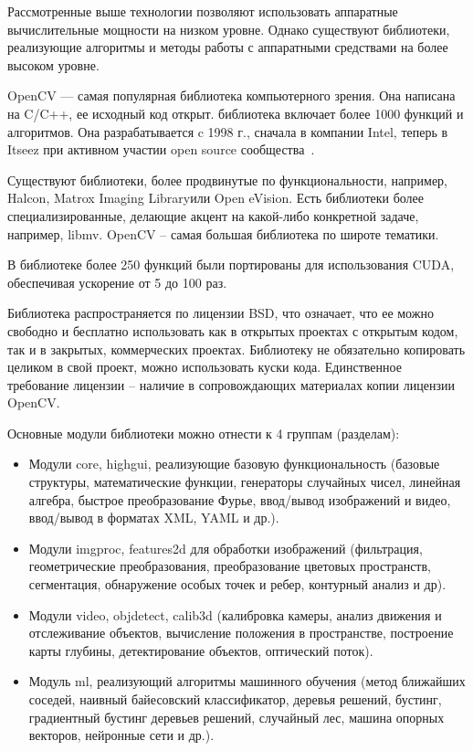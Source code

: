Рассмотренные выше технологии позволяют использовать аппаратные вычислительные мощности на низком уровне. Однако существуют библиотеки, реализующие алгоритмы и методы работы с аппаратными средствами на более высоком уровне. 

OpenCV --- самая популярная библиотека компьютерного зрения. Она написана на C/C++, ее исходный код открыт. библиотека включает более 1000 функций и алгоритмов. Она разрабатывается c 1998 г., сначала в компании Intel, теперь в Itseez при активном участии open source сообщества~\cite{ocvrus_wiki}.

Существуют библиотеки, более продвинутые по функциональности, например, Halcon, Matrox Imaging Libraryили  Open eVision. Есть библиотеки более специализированные, делающие акцент на какой-либо конкретной задаче, например, libmv. OpenCV – самая большая библиотека по широте тематики.

В библиотеке более 250 функций были портированы для использования CUDA, обеспечивая ускорение от 5 до 100 раз.

Библиотека распространяется по лицензии BSD, что означает, что ее можно свободно и бесплатно использовать как в открытых проектах с открытым кодом, так и в закрытых, коммерческих проектах. Библиотеку не обязательно копировать целиком в свой проект, можно использовать куски кода. Единственное требование лицензии – наличие в сопровождающих материалах копии лицензии OpenCV.

Основные модули библиотеки можно отнести к 4 группам (разделам):
\begin{itemize}
  \item Модули core, highgui, реализующие базовую функциональность (базовые структуры, математические функции, генераторы случайных чисел, линейная алгебра, быстрое преобразование Фурье, ввод/вывод изображений и видео, ввод/вывод в форматах XML, YAML и др.).
  \item Модули imgproc, features2d для обработки изображений (фильтрация, геометрические преобразования, преобразование цветовых пространств, сегментация, обнаружение особых точек и ребер, контурный анализ и др).
  \item Модули video, objdetect, calib3d (калибровка камеры, анализ движения и отслеживание объектов, вычисление положения в пространстве, построение карты глубины, детектирование объектов, оптический поток).
  \item Модуль ml, реализующий алгоритмы машинного обучения (метод ближайших соседей, наивный байесовский классификатор, деревья решений, бустинг, градиентный бустинг деревьев решений, случайный лес, машина опорных векторов, нейронные сети и др.).
\end{itemize}
